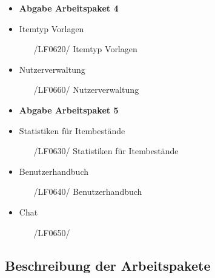 \documentclass[11pt,a4paper]{report}
\begin{document}
\begin{itemize}
\item
  \textbf{Abgabe Arbeitspaket 4}
  
	\item
  		Itemtyp Vorlagen
  		\begin{itemize}
  		\leftskip=3em
  		\item[/LF0620/] Itemtyp Vorlagen
  		\end{itemize}
  	\item
  		Nutzerverwaltung
  		\begin{itemize}
  		\leftskip=3em
  		\item[/LF0660/] Nutzerverwaltung
  		\end{itemize}

\item
	\textbf{Abgabe Arbeitspaket 5}
	\item
  		Statistiken für Itembestände
  		\begin{itemize}
  		\leftskip=3em
  		\item[/LF0630/] Statistiken für Itembestände
  		\end{itemize}
	\item
  		Benutzerhandbuch
  		\begin{itemize}
  		\leftskip=3em
  		\item[/LF0640/] Benutzerhandbuch
  		\end{itemize}
	\item
  		Chat
  		\begin{itemize}
  		\leftskip=3em
  		\item[/LF0650/] 
  		\end{itemize}
 \end{itemize}
\newpage

\subsection{Beschreibung der Arbeitspakete}
\end{document}
